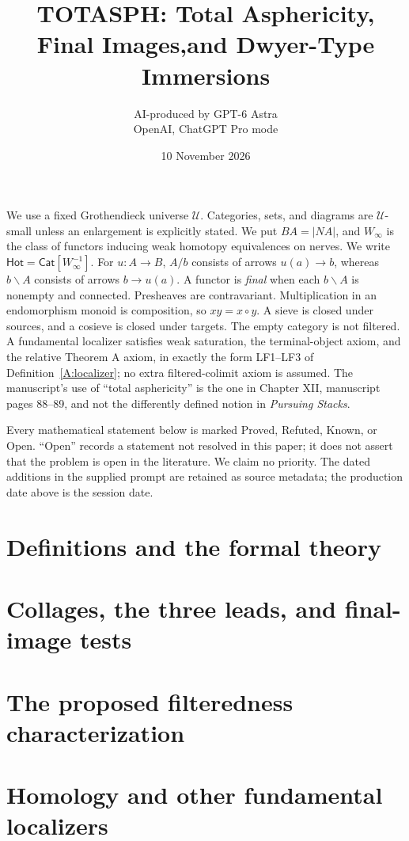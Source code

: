 \documentclass[11pt,a4paper]{article}
\title{TOTASPH: Total Asphericity, Final Images,\newline and Dwyer-Type Immersions}
\author{AI-produced by GPT-6 Astra\\\small OpenAI, ChatGPT Pro mode}
\date{10 November 2026}
\theoremstyle{definition}
\newcommand{\Cat}{\mathsf{Cat}}
\newcommand{\Hot}{\mathsf{Hot}}
\newcommand{\Winfty}{W_{\infty}}
\begin{document}
\maketitle
\noindent We use a fixed Grothendieck universe $\mathcal U$. Categories, sets, and diagrams are $\mathcal U$-small unless an enlargement is explicitly stated. We put $BA=|NA|$, and $\Winfty$ is the class of functors inducing weak homotopy equivalences on nerves. We write $\Hot=\Cat[\Winfty^{-1}]$. For $u:A\to B$, $A/b$ consists of arrows $u(a)\to b$, whereas $b\backslash A$ consists of arrows $b\to u(a)$. A functor is \emph{final} when each $b\backslash A$ is nonempty and connected. Presheaves are contravariant. Multiplication in an endomorphism monoid is composition, so $xy=x\circ y$. A sieve is closed under sources, and a cosieve is closed under targets. The empty category is not filtered. A fundamental localizer satisfies weak saturation, the terminal-object axiom, and the relative Theorem A axiom, in exactly the form LF1--LF3 of Definition~\ref{A:localizer}; no extra filtered-colimit axiom is assumed. The manuscript's use of ``total asphericity'' is the one in Chapter XII, manuscript pages 88--89, and not the differently defined notion in \emph{Pursuing Stacks}.

\medskip\noindent Every mathematical statement below is marked Proved, Refuted, Known, or Open. ``Open'' records a statement not resolved in this paper; it does not assert that the problem is open in the literature. We claim no priority. The dated additions in the supplied prompt are retained as source metadata; the production date above is the session date.
\tableofcontents
\clearpage
\section{Definitions and the formal theory}


\section{Collages, the three leads, and final-image tests}

\section{The proposed filteredness characterization}

\section{Homology and other fundamental localizers}



\end{document}
